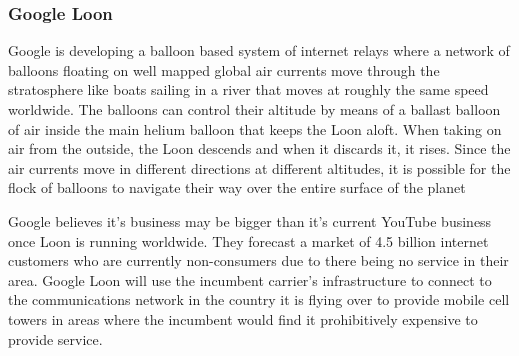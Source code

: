  
\subsubsection{Google Loon}
Google is developing a balloon based system of internet relays where a network of balloons floating on well mapped global air currents move through the stratosphere like boats sailing in a river that moves at roughly the same speed worldwide. The balloons can control their altitude by means of a ballast balloon of air inside the main helium balloon that keeps the Loon aloft. When taking on air from the outside, the Loon descends and when it discards it, it rises. Since the air currents move in different directions at different altitudes, it is possible for the flock of balloons to navigate their way over the entire surface of the planet

Google believes it's business may be bigger than it's current YouTube business once Loon is running worldwide. They forecast a market of 4.5 billion internet customers who are currently non-consumers due to there being no service in their area. Google Loon will use the incumbent carrier's infrastructure to connect to the communications network in the country it is flying over to provide mobile cell towers in areas where the incumbent would find it prohibitively expensive to provide service.


